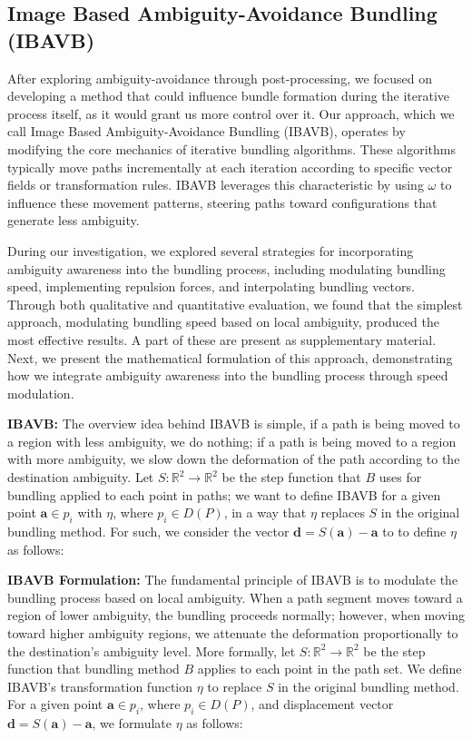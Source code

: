 \subsection{Image Based Ambiguity-Avoidance Bundling (IBAVB)}

After exploring ambiguity-avoidance through post-processing, we focused on developing a method that could influence bundle formation during the iterative process itself, as it would grant us more control over it. Our approach, which we call Image Based Ambiguity-Avoidance Bundling (IBAVB), operates by modifying the core mechanics of iterative bundling algorithms. These algorithms typically move paths incrementally at each iteration according to specific vector fields or transformation rules. IBAVB leverages this characteristic by using $\omega$ to influence these movement patterns, steering paths toward configurations that generate less ambiguity.

During our investigation, we explored several strategies for incorporating ambiguity awareness into the bundling process, including modulating bundling speed, implementing repulsion forces, and interpolating bundling vectors. Through both qualitative and quantitative evaluation, we found that the simplest approach, modulating bundling speed based on local ambiguity, produced the most effective results. A part of these are present as supplementary material. Next, we present the mathematical formulation of this approach, demonstrating how we integrate ambiguity awareness into the bundling process through speed modulation.

\textbf{IBAVB:} The overview idea behind IBAVB is simple, if a path is being moved to a region with less ambiguity, we do nothing; if a path is being moved to a region with more ambiguity, we slow down the deformation of the path according to the destination ambiguity. Let $S : \mathbb{R}^2 \rightarrow \mathbb{R}^2$ be the step function that $B$ uses for bundling applied to each point in paths; we want to define IBAVB for a given point $\mathbf{a} \in p_i$ with $\eta$, where $p_i \in D(P)$, in a way that $\eta$ replaces $S$ in the original bundling method. For such, we consider the vector $\mathbf{d} = S(\mathbf{a}) - \mathbf{a}$ to to define $\eta$ as follows:

\textbf{IBAVB Formulation:} The fundamental principle of IBAVB is to modulate the bundling process based on local ambiguity. When a path segment moves toward a region of lower ambiguity, the bundling proceeds normally; however, when moving toward higher ambiguity regions, we attenuate the deformation proportionally to the destination's ambiguity level. More formally, let $S : \mathbb{R}^2 \rightarrow \mathbb{R}^2$ be the step function that bundling method $B$ applies to each point in the path set. We define IBAVB's transformation function $\eta$ to replace $S$ in the original bundling method. For a given point $\mathbf{a} \in p_i$, where $p_i \in D(P)$, and displacement vector $\mathbf{d} = S(\mathbf{a}) - \mathbf{a}$, we formulate $\eta$ as follows:

